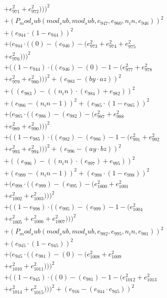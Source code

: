 \documentclass[10pt, a4paper]{article}
\begin{document}
\begin{small}
\begin{align*}
& + e_{971}^{2} + e_{972}^{2})))^{2} \\
& + (P_mod_sub(mod_sub, mod_sub, e_{947}, e_{960}, n_in, e_{946}))^{2} \\
& + (e_{944}  \cdot  (1 - e_{944}))^{2} \\
& + (e_{944}  \cdot  ((0) - (e_{946}) - (e_{973}^{2} + e_{974}^{2} + e_{975}^{2} \\
& + e_{976}^{2})))^{2} \\
& + ((1 - e_{944})  \cdot  ((e_{946}) - (0) - 1 - (e_{977}^{2} + e_{978}^{2} \\
& + e_{979}^{2} + e_{980}^{2})))^{2} + (e_{983} - (by  \cdot  az))^{2} \\
& + ((e_{983}) - ((n_in)  \cdot  (e_{984}) + e_{982}))^{2} \\
& + (e_{986} - (n_in - 1))^{2} + (e_{985}  \cdot  (1 - e_{985}))^{2} \\
& + (e_{985}  \cdot  ((e_{986}) - (e_{982}) - (e_{987}^{2} + e_{988}^{2} \\
& + e_{989}^{2} + e_{990}^{2})))^{2} \\
& + ((1 - e_{985})  \cdot  ((e_{982}) - (e_{986}) - 1 - (e_{991}^{2} + e_{992}^{2} \\
& + e_{993}^{2} + e_{994}^{2})))^{2} + (e_{996} - (ay  \cdot  bz))^{2} \\
& + ((e_{996}) - ((n_in)  \cdot  (e_{997}) + e_{995}))^{2} \\
& + (e_{999} - (n_in - 1))^{2} + (e_{998}  \cdot  (1 - e_{998}))^{2} \\
& + (e_{998}  \cdot  ((e_{999}) - (e_{995}) - (e_{1000}^{2} + e_{1001}^{2} \\
& + e_{1002}^{2} + e_{1003}^{2})))^{2} \\
& + ((1 - e_{998})  \cdot  ((e_{995}) - (e_{999}) - 1 - (e_{1004}^{2} \\
& + e_{1005}^{2} + e_{1006}^{2} + e_{1007}^{2})))^{2} \\
& + (P_mod_sub(mod_sub, mod_sub, e_{982}, e_{995}, n_in, e_{981}))^{2} \\
& + (e_{945}  \cdot  (1 - e_{945}))^{2} \\
& + (e_{945}  \cdot  ((e_{981}) - (0) - (e_{1008}^{2} + e_{1009}^{2} \\
& + e_{1010}^{2} + e_{1011}^{2})))^{2} \\
& + ((1 - e_{945})  \cdot  ((0) - (e_{981}) - 1 - (e_{1012}^{2} + e_{1013}^{2} \\
& + e_{1014}^{2} + e_{1015}^{2})))^{2} + (e_{916} - (e_{944}  \cdot  e_{945}))^{2} \\

\end{align*}
\end{small}
\end{document}
